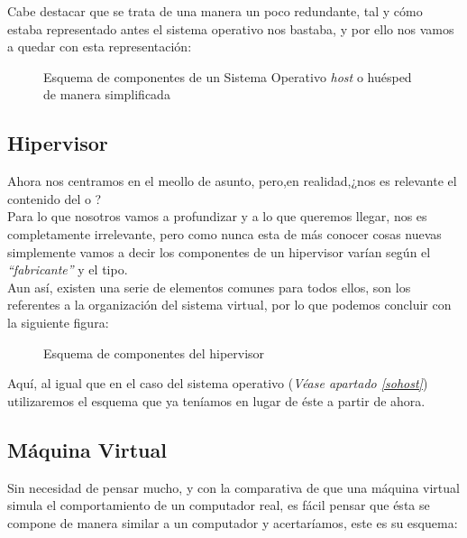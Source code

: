 Cabe destacar que se trata de una manera un poco redundante, tal y cómo estaba representado antes el sistema operativo nos bastaba, y por ello nos vamos a quedar con esta representación:

\begin{figure}[H]
\begin{center}
\end{center}
\caption[Sistema Operativo huésped simplificado]{Esquema de componentes de un Sistema Operativo \emph{host} o huésped de manera simplificada}
\end{figure}

\subsection{Hipervisor}
Ahora nos centramos en el meollo de asunto, pero,en realidad,¿nos es relevante el contenido del  o ?\\

Para lo que nosotros vamos a profundizar y a lo que queremos llegar, nos es completamente irrelevante, pero como nunca esta de más conocer cosas nuevas simplemente vamos a decir los componentes de un hipervisor varían según el \emph{\textquotedblleft fabricante\textquotedblright} y el tipo.\\

Aun así, existen una serie de elementos comunes para todos ellos, son los referentes a la organización del sistema virtual, por lo que podemos concluir con la siguiente figura:

\begin{figure}[H]
\begin{center}
\end{center}
\caption[Componentes hipervisor]{Esquema de componentes del hipervisor}
\end{figure}

Aquí, al igual que en el caso del sistema operativo (\textit{Véase apartado \ref{sohost}}) utilizaremos el esquema que ya teníamos en lugar de éste a partir de ahora.

\subsection{Máquina Virtual}\label{apartadomaqvir}
Sin necesidad de pensar mucho, y con la comparativa de que una máquina virtual simula el comportamiento de un computador real, es fácil pensar que ésta se compone de manera similar a un computador y acertaríamos, este es su esquema:

